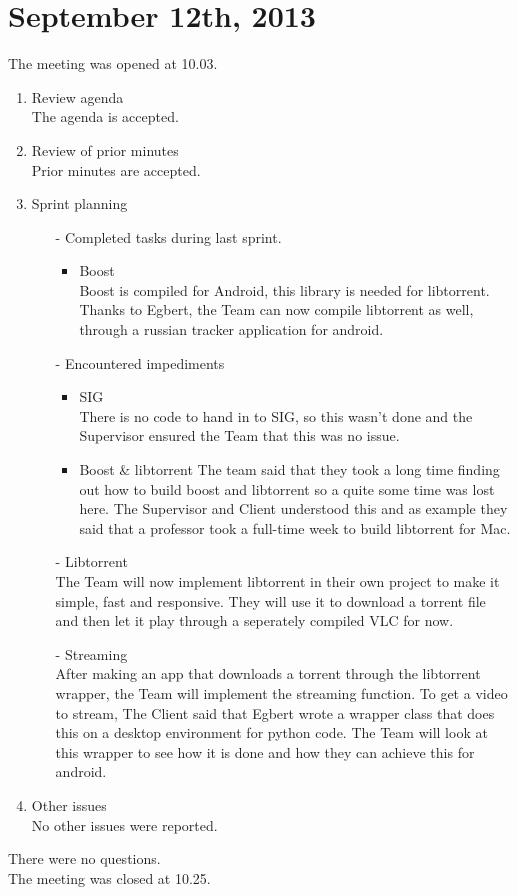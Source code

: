 \section{September 12th, 2013}

The meeting was opened at 10.03.\\

\begin{enumerate}
\item Review agenda\\	
The agenda is accepted.
\item Review of prior minutes\\
Prior minutes are accepted.
\item Sprint planning\\
\begin{enumerate}
\item[-] Completed tasks during last sprint.\\
	\begin{itemize}
	\item Boost\\
Boost is compiled for Android, this library is needed for libtorrent.
Thanks to Egbert, the Team can now compile libtorrent as well, through a russian tracker application for android.
	\end{itemize}
\item[-] Encountered impediments\\
	\begin{itemize}
	\item SIG\\
There is no code to hand in to SIG, so this wasn't done and the Supervisor ensured the Team that this was no issue.
	\item Boost \& libtorrent
The team said that they took a long time finding out how to build boost and libtorrent so a quite some time was lost here. The Supervisor and Client understood this and as example they said that a professor took a full-time week to build libtorrent for Mac.
	\end{itemize}
\item[-] Libtorrent\\
The Team will now implement libtorrent in their own project to make it simple, fast and responsive. They will use it to download a torrent file and then let it play through a seperately compiled VLC for now.
\item[-] Streaming\\
After making an app that downloads a torrent through the libtorrent wrapper, the Team will implement the streaming function. To get a video to stream, The Client said that Egbert wrote a wrapper class that does this on a desktop environment for python code. The Team will look at this wrapper to see how it is done and how they can achieve this for android.
\end{enumerate}
\item Other issues\\
No other issues were reported.
\end{enumerate}

There were no questions.\\

The meeting was closed at 10.25.\\
